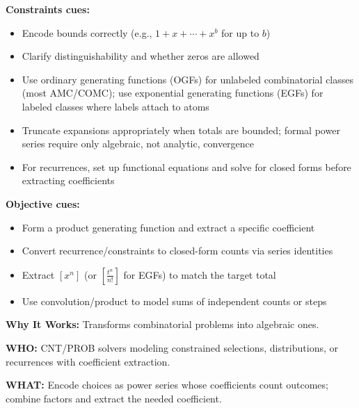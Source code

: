 \documentclass[12pt]{article}
\begin{document}
\textbf{Constraints cues:}
\begin{itemize}
    \item Encode bounds correctly (e.g., $1+x+\cdots+x^b$ for up to $b$)
    \item Clarify distinguishability and whether zeros are allowed
    \item Use ordinary generating functions (OGFs) for unlabeled combinatorial classes (most AMC/COMC); use exponential generating functions (EGFs) for labeled classes where labels attach to atoms
    \item Truncate expansions appropriately when totals are bounded; formal power series require only algebraic, not analytic, convergence
    \item For recurrences, set up functional equations and solve for closed forms before extracting coefficients
\end{itemize}

\textbf{Objective cues:}
\begin{itemize}
    \item Form a product generating function and extract a specific coefficient
    \item Convert recurrence/constraints to closed-form counts via series identities
    \item Extract $[x^n]$ (or $[\tfrac{t^n}{n!}]$ for EGFs) to match the target total
    \item Use convolution/product to model sums of independent counts or steps
\end{itemize}

\textbf{Why It Works:} Transforms combinatorial problems into algebraic ones.

\textbf{WHO:} CNT/PROB solvers modeling constrained selections, distributions, or recurrences with coefficient extraction.

\textbf{WHAT:} Encode choices as power series whose coefficients count outcomes; combine factors and extract the needed coefficient.
\end{document}
